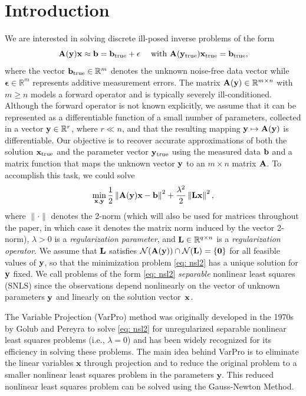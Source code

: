 \documentclass[onefignum,onetabnum]{siamart171218}
\newcommand{\bA}{{\bf A}}
\newcommand{\bL}{{\bf L}}
\newcommand{\bb}{{\bf b}}
\newcommand{\bx}{{\bf x}}
\newcommand{\by}{{\bf y}}
\begin{document}
\section{Introduction} We are interested in solving discrete ill-posed inverse problems of the form 
\begin{equation*}
\bA(\by)\bx  \approx \bb =  \bb_{\rm true} + \mathbf{\epsilon} \quad \mbox{ with } \bA( \by_{\rm true}) \bx_{\rm true} = \bb_{\rm true},
\end{equation*}
where the vector $\bb_{\rm true} \in \mathbb{R}^m$ denotes the unknown noise-free data vector while $\mathbf{\epsilon} \in \mathbb{R}^m$ represents additive measurement errors. The matrix $\bA(\by) \in \mathbb{R}^{m\times n}$ with $m\geq n$ models a forward operator and is typically severely ill-conditioned. Although the forward operator is not known explicitly, we assume that it can be represented as a differentiable function of a small number of parameters, collected in a vector $\by \in \mathbb{R}^r$, where $r \ll n$, and that the resulting mapping $\by \mapsto \bA(\by)$ is differentiable. Our objective is to recover accurate approximations of both the solution $\bx_{\rm true}$ and the parameter vector $\by_{\rm true}$ using the measured data $\bb$ and a matrix function that maps the unknown vector $\by$ to an $m \times n$ matrix $\bA$. To accomplish this task, we could solve
\begin{equation}\label{eq: nsl2}
\min_{\bx, \by} \frac{1}{2}\left\|\bA(\by)\bx - \bb \right\|^2 + \frac{\lambda^2}{2} \left\|\bL \bx\right\|^2,
\end{equation}
where $\|\cdot\|$ denotes the 2-norm (which will also be used for matrices throughout the paper, in which case it denotes the matrix norm induced by the vector 2-norm), $\lambda>0$ is a \emph{regularization parameter}, and $\bL \in \mathbb{R}^{q\times n}$ is a \emph{regularization operator}. We assume that $\bL$ satisfies $\mathcal{N}(\bA(\by)) \cap \mathcal{N} (\bL) = \{\boldsymbol{0}\}$ for all feasible values of $\by$, so that the minimization problem \eqref{eq: nsl2} has a unique solution for $\by$ fixed. We call problems of the form \eqref{eq: nsl2}  \emph{separable} nonlinear least squares (SNLS) since the observations depend nonlinearly on the vector of unknown parameters $\by$ and linearly on the solution vector~$\bx$. 

The Variable Projection (VarPro) method was originally developed in the 1970s by Golub and Pereyra \cite{golub1973differentiation} to solve \eqref{eq: nsl2} for unregularized separable nonlinear least squares problems (i.e., $\lambda=0$) and has been widely recognized for its efficiency in solving these problems. The main idea behind VarPro is to eliminate the linear variables $\mathbf{x}$ through projection and to reduce the original problem to a smaller nonlinear least squares problem in the parameters $\mathbf{y}$. This reduced nonlinear least squares problem can be solved using the Gauss-Newton Method.
\end{document}
